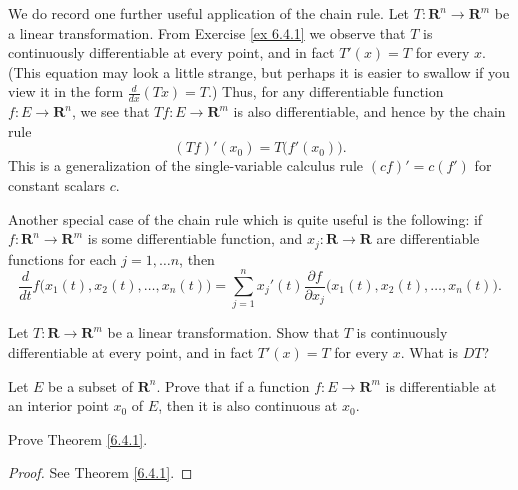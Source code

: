 \begin{note}
    We do record one further useful application of the chain rule.
    Let \(T : \mathbf{R}^n \to \mathbf{R}^m\) be a linear transformation.
    From Exercise \ref{ex 6.4.1} we observe that \(T\) is continuously differentiable at every point, and in fact \(T'(x) = T\) for every \(x\).
    (This equation may look a little strange, but perhaps it is easier to swallow if you view it in the form \(\frac{d}{dx} (Tx) = T\).)
    Thus, for any differentiable function \(f : E \to \mathbf{R}^n\), we see that \(T f : E \to \mathbf{R}^m\) is also differentiable, and hence by the chain rule
    \[
        (T f)'(x_0) = T\big(f'(x_0)\big).
    \]
    This is a generalization of the single-variable calculus rule \((cf)' = c(f')\) for constant scalars \(c\).
\end{note}

\begin{note}
    Another special case of the chain rule which is quite useful is the following:
    if \(f : \mathbf{R}^n \to \mathbf{R}^m\) is some differentiable function, and \(x_j : \mathbf{R} \to \mathbf{R}\) are differentiable functions for each \(j = 1, \dots n\), then
    \[
        \frac{d}{dt} f\big(x_1(t), x_2(t), \dots, x_n(t)\big) = \sum_{j = 1}^n x_j'(t) \frac{\partial f}{\partial x_j} \big(x_1(t), x_2(t), \dots, x_n(t)\big).
    \]
\end{note}

\exercisesection

\begin{exercise}\label{ex 6.4.1}
    Let \(T : \mathbf{R} \to \mathbf{R}^m\) be a linear transformation.
    Show that \(T\) is continuously differentiable at every point, and in fact \(T'(x) = T\) for every \(x\).
    What is \(D T\)?
\end{exercise}

\begin{exercise}\label{ex 6.4.2}
    Let \(E\) be a subset of \(\mathbf{R}^n\).
    Prove that if a function \(f : E \to \mathbf{R}^m\) is differentiable at an interior point \(x_0\) of \(E\), then it is also continuous at \(x_0\).
\end{exercise}

\begin{exercise}\label{ex 6.4.3}
    Prove Theorem \ref{6.4.1}.
\end{exercise}

\begin{proof}
    See Theorem \ref{6.4.1}.
\end{proof}

